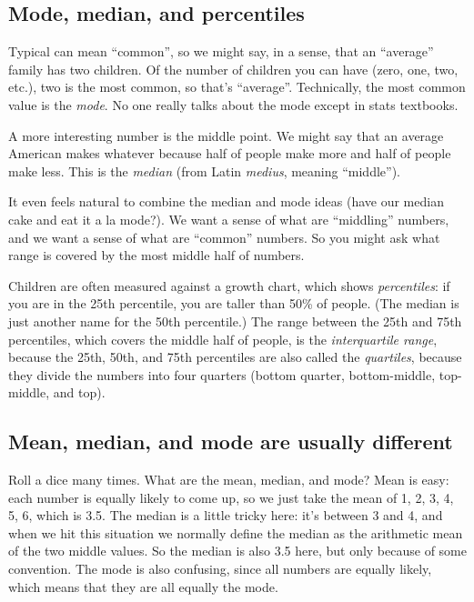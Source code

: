 \documentclass{book}
\begin{document}
\subsection{Mode, median, and
percentiles}\label{mode-median-and-percentiles}

Typical can mean ``common'', so we might say, in a sense, that an
``average'' family has two children. Of the number of children you can
have (zero, one, two, etc.), two is the most common, so that's
``average''. Technically, the most common value is the \emph{mode}. No
one really talks about the mode except in stats textbooks.

A more interesting number is the middle point. We might say that an
average American makes whatever because half of people make more and
half of people make less. This is the \emph{median} (from Latin
\emph{medius}, meaning ``middle'').

It even feels natural to combine the median and mode ideas (have our
median cake and eat it a la mode?). We want a sense of what are
``middling'' numbers, and we want a sense of what are ``common''
numbers. So you might ask what range is covered by the most middle half
of numbers.

Children are often measured against a growth chart, which shows
\emph{percentiles}: if you are in the 25th percentile, you are taller
than 50\% of people. (The median is just another name for the 50th
percentile.) The range between the 25th and 75th percentiles, which
covers the middle half of people, is the \emph{interquartile range},
because the 25th, 50th, and 75th percentiles are also called the
\emph{quartiles}, because they divide the numbers into four quarters
(bottom quarter, bottom-middle, top-middle, and top).

\subsection{Mean, median, and mode are usually
different}\label{mean-median-and-mode-are-usually-different}

Roll a dice many times. What are the mean, median, and mode? Mean is
easy: each number is equally likely to come up, so we just take the mean
of 1, 2, 3, 4, 5, 6, which is 3.5. The median is a little tricky here:
it's between 3 and 4, and when we hit this situation we normally define
the median as the arithmetic mean of the two middle values. So the
median is also 3.5 here, but only because of some convention. The mode
is also confusing, since all numbers are equally likely, which means
that they are all equally the mode.
\end{document}
